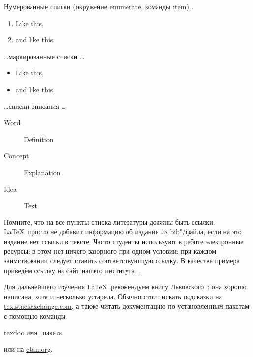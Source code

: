 Нумерованные списки (окружение enumerate, команды item)…

\begin{enumerate}
  \item Like this,
  \item and like this.
\end{enumerate}

\dots маркированные списки \dots

\begin{itemize}
  \item Like this,
  \item and like this.
\end{itemize}

\dots списки-описания \dots

\begin{description}
  \item[Word] Definition
  \item[Concept] Explanation
  \item[Idea] Text
\end{description}

\Conc

Помните, что на все пункты списка литературы должны быть ссылки. \LaTeX\ просто не добавит информацию об издании из bib"/файла, если на это издание нет ссылки в тексте. Часто студенты используют в работе  электронные ресурсы: в этом нет ничего зазорного при одном условии: при каждом заимствовании следует ставить соответствующую ссылку. В качестве примера приведём ссылку на сайт нашего института~\autocite{mmcs}.

Для дальнейшего изучения \LaTeX\ рекомендуем книгу Львовского~\autocite{Lvo2003}: она хорошо написана, хотя и несколько устарела.
Обычно стоит искать подсказки на
\href{http://tex.stackexchange.com/}{tex.stackexchange.com}, а также
читать документацию по установленным пакетам с помощью
команды
\begin{Verb}
texdoc имя_пакета
\end{Verb}
или на \href{http://ctan.org/}{ctan.org}.

\printbibliography[%
    heading=bibintoc%
]


